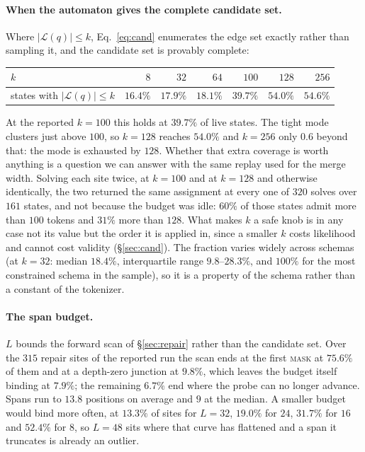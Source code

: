 \paragraph{When the automaton gives the complete candidate set.}
Where $|\mathcal{L}(q)| \le k$, Eq.~\ref{eq:cand} enumerates the edge set exactly rather
than sampling it, and the candidate set is provably complete:

\begin{center}
\small
\begin{tabular}{lrrrrrr}
\toprule
$k$ & $8$ & $32$ & $64$ & $100$ & $128$ & $256$ \\
\midrule
states with $|\mathcal{L}(q)| \le k$ & $16.4\%$ & $17.9\%$ & $18.1\%$ & $39.7\%$ & $54.0\%$ & $54.6\%$ \\
\bottomrule
\end{tabular}
\end{center}

At the reported $k{=}100$ this holds at $39.7\%$ of live states. The tight mode
clusters just above $100$, so $k{=}128$ reaches $54.0\%$ and $k{=}256$ only $0.6$
beyond that: the mode is exhausted by $128$. Whether that extra coverage is worth
anything is a question we can answer with the same replay used for the merge
width. Solving each site twice, at $k{=}100$ and at $k{=}128$ and otherwise
identically, the two returned the same assignment at every one of $320$ solves
over $161$ states, and not because the budget was idle: $60\%$ of those states
admit more than $100$ tokens and $31\%$ more than $128$. What makes $k$ a safe
knob is in any case not its value but the order it is applied in, since a smaller
$k$ costs likelihood and cannot cost validity (\S\ref{sec:cand}). The fraction varies widely across schemas (at $k{=}32$:
median $18.4\%$, interquartile range $9.8$--$28.3\%$, and $100\%$ for the most
constrained schema in the sample), so it is a property of the schema rather than
a constant of the tokenizer.

\paragraph{The span budget.}
$L$ bounds the forward scan of \S\ref{sec:repair} rather than the candidate set.
Over the $315$ repair sites of the reported run the scan ends at the first
\textsc{mask} at $75.6\%$ of them and at a depth-zero junction at $9.8\%$, which
leaves the budget itself binding at $7.9\%$; the remaining $6.7\%$ end where the
probe can no longer advance. Spans run to $13.8$ positions on average and $9$ at
the median. A smaller budget would bind more often, at $13.3\%$ of sites for
$L{=}32$, $19.0\%$ for $24$, $31.7\%$ for $16$ and $52.4\%$ for $8$, so
$L{=}48$ sits where that curve has flattened and a span it truncates is already
an outlier.

